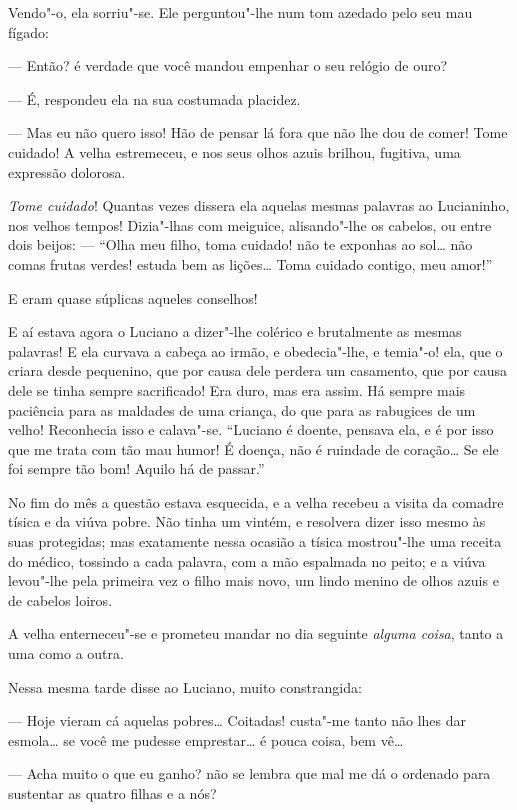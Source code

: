 Vendo"-o, ela sorriu"-se. Ele perguntou"-lhe num tom azedado pelo seu mau
fígado:

--- Então? é verdade que você mandou empenhar o seu relógio de ouro?

--- É, respondeu ela na sua costumada placidez.

--- Mas eu não quero isso! Hão de pensar lá fora que não lhe dou de
comer! Tome cuidado! A velha estremeceu, e nos seus olhos azuis brilhou,
fugitiva, uma expressão dolorosa.

\emph{Tome cuidado}! Quantas vezes dissera ela aquelas mesmas palavras
ao Lucianinho, nos velhos tempos! Dizia"-lhas com meiguice, alisando"-lhe
os cabelos, ou entre dois beijos: --- ``Olha meu filho, toma cuidado!
não te exponhas ao sol\ldots{} não comas frutas verdes! estuda bem as
lições\ldots{} Toma cuidado contigo, meu amor!''

E eram quase súplicas aqueles conselhos!

E aí estava agora o Luciano a dizer"-lhe colérico e brutalmente as mesmas
palavras! E ela curvava a cabeça ao irmão, e obedecia"-lhe, e temia"-o!
ela, que o criara desde pequenino, que por causa dele perdera um
casamento, que por causa dele se tinha sempre sacrificado! Era duro, mas
era assim. Há sempre mais paciência para as maldades de uma criança, do
que para as rabugices de um velho! Reconhecia isso e calava"-se.
``Luciano é doente, pensava ela, e é por isso que me trata com tão mau
humor! É doença, não é ruindade de coração\ldots{} Se ele foi sempre tão bom!
Aquilo há de passar.''

No fim do mês a questão estava esquecida, e a velha recebeu a visita da
comadre tísica e da viúva pobre. Não tinha um vintém, e resolvera dizer
isso mesmo às suas protegidas; mas exatamente nessa ocasião a tísica
mostrou"-lhe uma receita do médico, tossindo a cada palavra, com a mão
espalmada no peito; e a viúva levou"-lhe pela primeira vez o filho mais
novo, um lindo menino de olhos azuis e de cabelos loiros.

A velha enterneceu"-se e prometeu mandar no dia seguinte \emph{alguma
coisa}, tanto a uma como a outra.

Nessa mesma tarde disse ao Luciano, muito constrangida:

--- Hoje vieram cá aquelas pobres\ldots{} Coitadas! custa"-me tanto não lhes
dar esmola\ldots{} se você me pudesse emprestar\ldots{} é pouca coisa, bem vê\ldots{}

--- Acha muito o que eu ganho? não se lembra que mal me dá o ordenado
para sustentar as quatro filhas e a nós?

